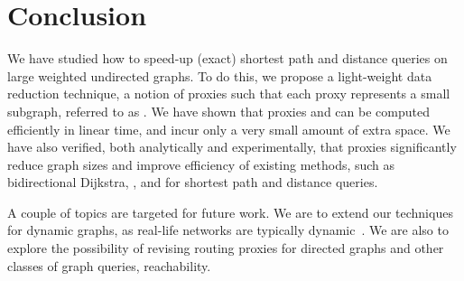 \section{Conclusion}
\label{sec-con}

We have studied how to speed-up (exact)  shortest path and distance queries on large weighted undirected graphs.
To do this, we  propose  a light-weight data reduction technique, a notion of proxies such that each proxy represents a small subgraph, referred to as \dras. We have shown that
proxies and \dras can be computed efficiently in linear time, and incur only a very small amount of extra space.  We have also verified,
both analytically and experimentally, that proxies significantly reduce graph sizes and improve efficiency of existing methods, such as bidirectional Dijkstra, \arcflag, \tnr and \ah for shortest path and distance queries.

A couple of topics are targeted for future work.
%
We are to extend our techniques for dynamic graphs, as real-life networks are typically dynamic~\cite{YuAMW13,fcs-biggraph}.
%
We are also to explore the possibility of revising routing proxies for directed graphs and other classes of graph queries, \eg reachability.
